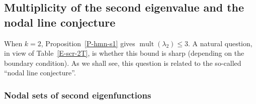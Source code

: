 \documentclass[12pt,a4paper]{amsart}
\theoremstyle{plain} %
\theoremstyle{definition}
\numberwithin{equation}{section}
\numberwithin{figure}{section}
\numberwithin{table}{section}
\DeclareMathOperator{\mult}{mult}
\begin{document}
\subsection{Multiplicity of the second eigenvalue and the nodal line conjecture}\label{SS-hmn-0C}%

When $k=2$, Proposition~\ref{P-hmn-s1} gives $\mult(\lambda_2) \le 3$.  A natural question, in view of Table~\ref{E-scr-2T}, is whether this bound is sharp (depending on the boundary condition). As we shall see, this question is related to the so-called  ``nodal line conjecture''.

\subsubsection{Nodal sets of second eigenfunctions}\label{SSS-hmn-0CA}
\end{document}
